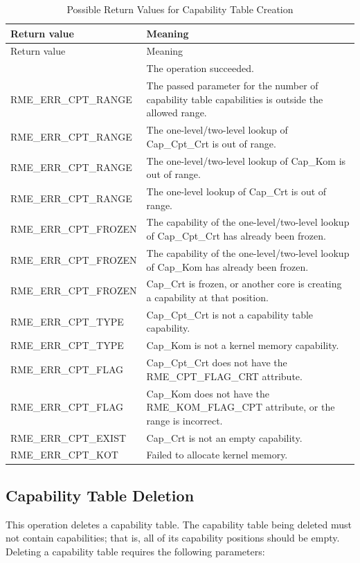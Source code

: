 \begin{xltabular}{\textwidth}{@{}>{\hsize\raggedright\arraybackslash}X>{\hsize\raggedright\arraybackslash}X@{}}
\caption{Possible Return Values for Capability Table Creation}\label{tab:2-6-create-capability-table-return-values}\\
\toprule
Return value & Meaning\tabularnewline
\endfirsthead
\toprule
Return value & Meaning\tabularnewline
\midrule
\endhead
\bottomrule
{} & The operation succeeded.\tabularnewline
    RME\_ERR\_CPT\_RANGE & The passed parameter for the number of capability table capabilities is outside the allowed range.\tabularnewline
    RME\_ERR\_CPT\_RANGE & The one-level/two-level lookup of Cap\_Cpt\_Crt is out of range.\tabularnewline
    RME\_ERR\_CPT\_RANGE & The one-level/two-level lookup of Cap\_Kom is out of range.\tabularnewline
    RME\_ERR\_CPT\_RANGE & The one-level lookup of Cap\_Crt is out of range.\tabularnewline
    RME\_ERR\_CPT\_FROZEN & The capability of the one-level/two-level lookup of Cap\_Cpt\_Crt has already been frozen.\tabularnewline
    RME\_ERR\_CPT\_FROZEN & The capability of the one-level/two-level lookup of Cap\_Kom has already been frozen.\tabularnewline
    RME\_ERR\_CPT\_FROZEN & Cap\_Crt is frozen, or another core is creating a capability at that position.\tabularnewline
    RME\_ERR\_CPT\_TYPE & Cap\_Cpt\_Crt is not a capability table capability.\tabularnewline
    RME\_ERR\_CPT\_TYPE & Cap\_Kom is not a kernel memory capability.\tabularnewline
    RME\_ERR\_CPT\_FLAG & Cap\_Cpt\_Crt does not have the RME\_CPT\_FLAG\_CRT attribute.\tabularnewline
    RME\_ERR\_CPT\_FLAG & Cap\_Kom does not have the RME\_KOM\_FLAG\_CPT attribute, or the range is incorrect.\tabularnewline
    RME\_ERR\_CPT\_EXIST & Cap\_Crt is not an empty capability.\tabularnewline
    RME\_ERR\_CPT\_KOT & Failed to allocate kernel memory.\tabularnewline
\end{xltabular}
\nopagebreak[4]

\subsection{Capability Table Deletion}\label{subsec:2-delete-a-capability-table}

This operation deletes a capability table. The capability table being deleted must not contain capabilities; that is, all of its capability positions should be empty. Deleting a capability table requires the following parameters:

